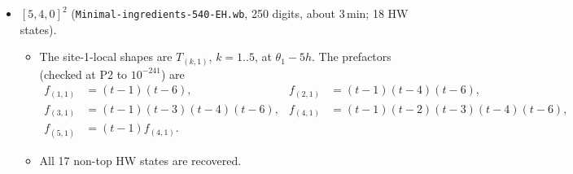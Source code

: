 \documentclass[11pt]{article}
\newcommand{\tw}{\theta_{12}}
\begin{document}
\begin{itemize}
  \begin{itemize}
  \item The site-1-local shapes ($\lambda_1\le5$, $c=-7..1$) are exactly $T_{(1,1)},T_{(2,2)},T_{(3,3)},T_{(4,4)},T_{(5,4)}$ at $\theta_1-5h$. So for $[\lambda_1,1,0]$ they are $T_{(k,k)}$, $k=1..\lambda_1-1$, plus $T_{(\lambda_1,\lambda_1-1)}$, which holds for $\lambda_1=2..5$.
  \item The prefactors, with $t=\tw/h$ (unique fits at P1, checked at P2 to $10^{-239}$):
  \begin{align*}
  f_{(1,1)}&=(t-4)(t-6), & f_{(2,2)}&=(t-3)(t-4)(t-5)(t-6),\\
  f_{(3,3)}&=(t-2)(t-3)(t-4)^2(t-5)(t-6), & f_{(4,4)}&=(t-1)(t-2)(t-3)^2(t-4)^2(t-5)(t-6),\\
  f_{(5,4)}&=(t-1)f_{(4,4)}.
  \end{align*}
  \item All 17 non-top HW states are recovered with scale.
    \begin{itemize}
    \item Fit at $10^{-5}$: errors $10^{-3.7}$--$10^{-5.8}$ at $(10^{-4},\varphi)$ and $10^{-4.2}$--$10^{-6.3}$ at $(10^{-5},\varphi')$, with at least 161 digits.
    \item Refit at $10^{-6}$: errors $10^{-5.2}$--$10^{-7.3}$ at $(10^{-6},\varphi')$. They fall by about a decade, so the stalls at $10^{-5}$ came from the fit point.
    \end{itemize}
  \item Only $[8,3,1]$ needs per-copy cleaning. $[9,2,1]$ works sector-wide but is weakly conditioned (second singular value $0.0036$). For $[\lambda_1,1,0]$ the per-copy sector is always $[\lambda_1+3,3,1]$.
  \end{itemize}
\item \textbf{$[5,4,0]^2$} (\texttt{Minimal-ingredients-540-EH.wb}, 250 digits, about 3\,min; 18 HW states).
  \begin{itemize}
  \item The site-1-local shapes are $T_{(k,1)}$, $k=1..5$, at $\theta_1-5h$. The prefactors (checked at P2 to $10^{-241}$) are
  \begin{align*}
  f_{(1,1)}&=(t-1)(t-6), & f_{(2,1)}&=(t-1)(t-4)(t-6),\\
  f_{(3,1)}&=(t-1)(t-3)(t-4)(t-6), & f_{(4,1)}&=(t-1)(t-2)(t-3)(t-4)(t-6),\\
  f_{(5,1)}&=(t-1)f_{(4,1)}.
  \end{align*}
  \item All 17 non-top HW states are recovered.

\end{itemize}
\end{itemize}
\end{document}
